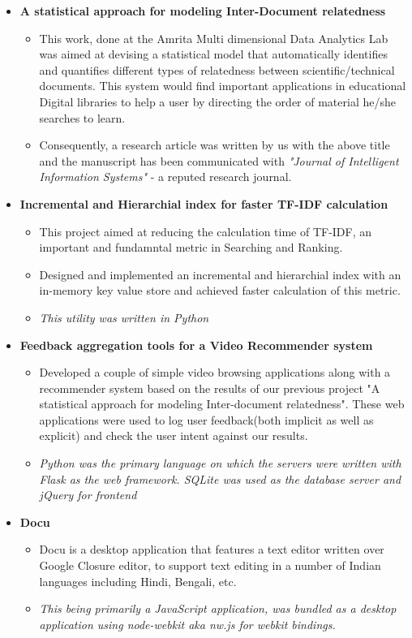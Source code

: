\documentclass[letterpaper,11pt]{article}
\newcommand{\resitem}[1]{\item #1 \vspace{-2pt}}
\newcommand{\resheading}[1]{\textbf{\sffamily{\mbox{~}{\large #1} \vphantom{p\^{E}}}}}
\begin{document}
\resheading{Projects}
\begin{itemize}
\item[]
	\textbf{A statistical approach for modeling Inter-Document relatedness}
	\vspace{-3mm}
	\begin{itemize}
		\resitem{This work, done at the Amrita Multi dimensional Data Analytics Lab was aimed at devising a statistical model that automatically identifies and quantifies different types of relatedness between scientific/technical documents. This system would find important applications in educational Digital libraries to help a user by directing the order of material he/she searches to learn.}
		\resitem{Consequently, a research article was written by us with the above title and the manuscript has been communicated with \textit{"Journal of Intelligent Information Systems"} - a reputed research journal.}
	\end{itemize}

\item[]
	\textbf{Incremental and Hierarchial index for faster TF-IDF calculation}
	\vspace{-3mm}
	\begin{itemize}
	    \resitem{This project aimed at reducing the calculation time of TF-IDF, an important and fundamntal metric in Searching and Ranking.}
		\resitem{Designed and implemented an incremental and hierarchial index with an in-memory key value store and achieved faster calculation of this metric.}
		\resitem{\textit{This utility was written in Python}}
	\end{itemize}

\item[]
	\textbf{Feedback aggregation tools for a Video Recommender system}
	\vspace{-3mm}
	\begin{itemize}
		\resitem{Developed a couple of simple video browsing applications along with a recommender system based on the results of our previous project "A statistical approach for modeling Inter-document relatedness". These web applications were used to log user feedback(both implicit as well as explicit) and check the user intent against our results.}
		\resitem{\textit{Python was the primary language on which the servers were written with Flask as the web framework. SQLite was used as the database server and jQuery for frontend}}
	\end{itemize}

\item[]
	\textbf{Docu}
	\vspace{-3mm}
	\begin{itemize}
		\resitem{Docu is a desktop application that features a text editor written over Google Closure editor, to support text editing in a number of Indian languages including Hindi, Bengali, etc.}
		\resitem{\textit{This being primarily a JavaScript application, was bundled as a desktop application using node-webkit aka nw.js for webkit bindings.}}
	\end{itemize}


\end{itemize}
\end{document}
